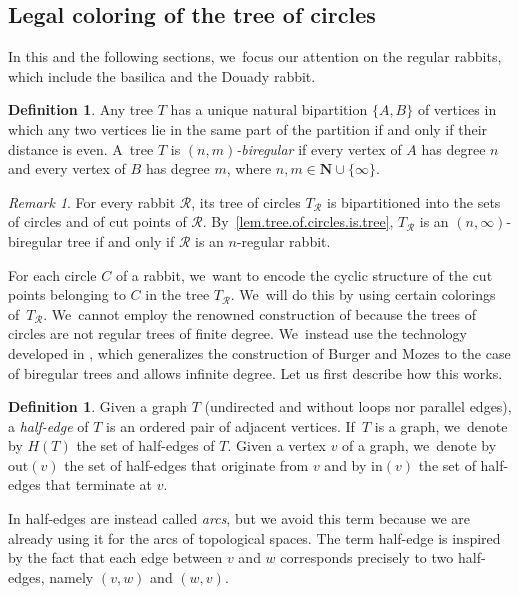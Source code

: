 \documentclass[JEP,XML,SOM,Unicode,NoFloatCountersInSection,published]{cedram}
\theoremstyle{plain}
\theoremstyle{definition}
\newtheorem{definition}[theorem]{Definition}
\theoremstyle{remark}
\newtheorem{remark}[theorem]{Remark}
\newcommand{\R}{\mathcal{R}}
\begin{document}
\subsection{Legal coloring of the tree of circles}

In this and the following sections, we~focus our attention on the regular rabbits, which include the basilica and the Douady rabbit.

\begin{definition}
\label{def.biregular.tree}
Any tree $T$ has a unique natural bipartition $\{A,B\}$ of vertices in which any two vertices lie in the same part of the partition if and only if their distance is even. A~tree $T$ is $(n,m)$\emph{-biregular} if every vertex of $A$ has degree $n$ and every vertex of $B$ has degree $m$, where $n, m \in \mathbf{N} \cup \{\infty\}$.
\end{definition}

\begin{remark}
For every rabbit $\R$, its tree of circles $T_\R$ is bipartitioned into the sets of circles and of cut points of $\R$. By~\cref{lem.tree.of.circles.is.tree}, $T_\R$ is an $(n,\infty)$-biregular tree if and only if $\R$ is an $n$-regular rabbit.
\end{remark}

For each circle $C$ of a rabbit, we~want to encode the cyclic structure of the cut points belonging to $C$ in the tree $T_\R$. We~will do this by using certain colorings of~$T_\R$. We~cannot employ the renowned construction of \cite{BM00} because the trees of circles are not regular trees of finite degree. We~instead use the technology developed in \cite{biregular}, which generalizes the construction of Burger and Mozes to the case of biregular trees and allows infinite degree.
Let us first describe how this works.

\begin{definition}
\label{def.half.edges}
Given a graph $T$ (undirected and without loops nor parallel edges), a \emph{half-edge} of $T$ is an ordered pair of adjacent vertices. If~$T$ is a graph, we~denote by $H(T)$ the set of half-edges of $T$.
Given a vertex $v$ of a graph, we~denote by $\mathrm{out}(v)$ the set of half-edges that originate from $v$ and by $\mathrm{in}(v)$ the set of half-edges that terminate at $v$.
\end{definition}

In \cite{biregular} half-edges are instead called \textit{arcs}, but we avoid this term because we are already using it for the arcs of topological spaces.
The term half-edge is inspired by the fact that each edge between $v$ and $w$ corresponds precisely to two half-edges, namely $(v,w)$ and $(w,v)$.
\end{document}
